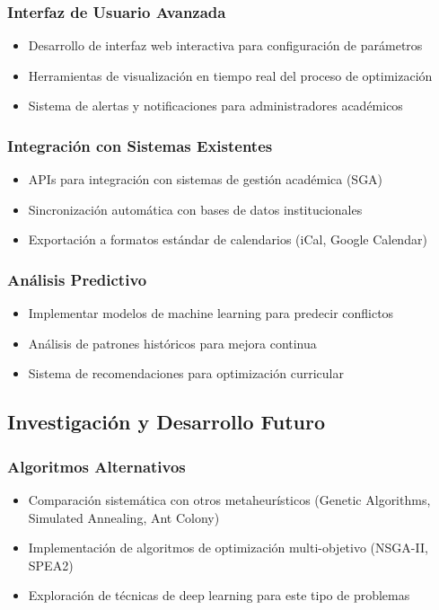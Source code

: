 \subsubsection{Interfaz de Usuario Avanzada}
\begin{itemize}
    \item Desarrollo de interfaz web interactiva para configuración de parámetros
    \item Herramientas de visualización en tiempo real del proceso de optimización
    \item Sistema de alertas y notificaciones para administradores académicos
\end{itemize}

\subsubsection{Integración con Sistemas Existentes}
\begin{itemize}
    \item APIs para integración con sistemas de gestión académica (SGA)
    \item Sincronización automática con bases de datos institucionales
    \item Exportación a formatos estándar de calendarios (iCal, Google Calendar)
\end{itemize}

\subsubsection{Análisis Predictivo}
\begin{itemize}
    \item Implementar modelos de machine learning para predecir conflictos
    \item Análisis de patrones históricos para mejora continua
    \item Sistema de recomendaciones para optimización curricular
\end{itemize}

\subsection{Investigación y Desarrollo Futuro}

\subsubsection{Algoritmos Alternativos}
\begin{itemize}
    \item Comparación sistemática con otros metaheurísticos (Genetic Algorithms, Simulated Annealing, Ant Colony)
    \item Implementación de algoritmos de optimización multi-objetivo (NSGA-II, SPEA2)
    \item Exploración de técnicas de deep learning para este tipo de problemas
\end{itemize}

